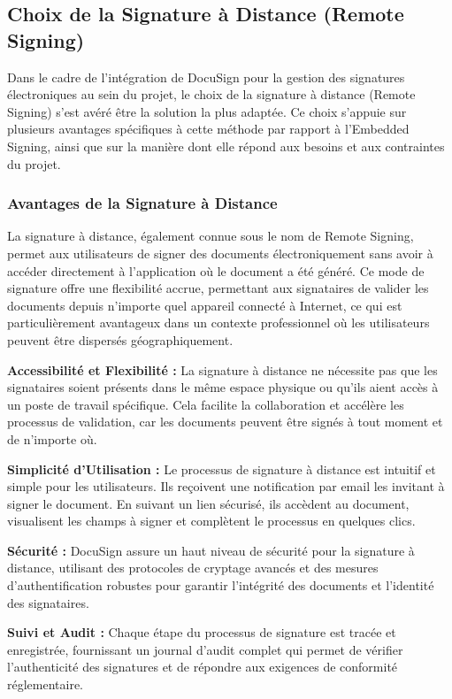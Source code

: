 \subsection{ Choix de la Signature à Distance (Remote Signing)}

Dans le cadre de l'intégration de DocuSign pour la gestion des signatures électroniques au sein du projet, le choix de la signature à distance (Remote Signing) s'est avéré être la solution la plus adaptée. Ce choix s'appuie sur plusieurs avantages spécifiques à cette méthode par rapport à l'Embedded Signing, ainsi que sur la manière dont elle répond aux besoins et aux contraintes du projet.

\subsubsection{Avantages de la Signature à Distance}
La signature à distance, également connue sous le nom de Remote Signing, permet aux utilisateurs de signer des documents électroniquement sans avoir à accéder directement à l'application où le document a été généré. Ce mode de signature offre une flexibilité accrue, permettant aux signataires de valider les documents depuis n'importe quel appareil connecté à Internet, ce qui est particulièrement avantageux dans un contexte professionnel où les utilisateurs peuvent être dispersés géographiquement.

\textbf{Accessibilité et Flexibilité :} La signature à distance ne nécessite pas que les signataires soient présents dans le même espace physique ou qu'ils aient accès à un poste de travail spécifique. Cela facilite la collaboration et accélère les processus de validation, car les documents peuvent être signés à tout moment et de n'importe où.

\textbf{Simplicité d'Utilisation : } Le processus de signature à distance est intuitif et simple pour les utilisateurs. Ils reçoivent une notification par email les invitant à signer le document. En suivant un lien sécurisé, ils accèdent au document, visualisent les champs à signer et complètent le processus en quelques clics.

\textbf{Sécurité :} DocuSign assure un haut niveau de sécurité pour la signature à distance, utilisant des protocoles de cryptage avancés et des mesures d'authentification robustes pour garantir l'intégrité des documents et l'identité des signataires.

\textbf{Suivi et Audit : } Chaque étape du processus de signature est tracée et enregistrée, fournissant un journal d'audit complet qui permet de vérifier l'authenticité des signatures et de répondre aux exigences de conformité réglementaire.




